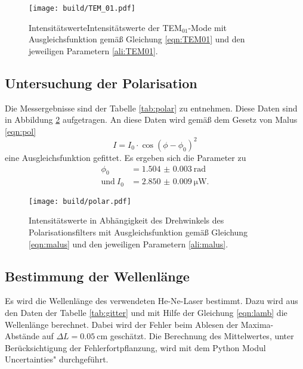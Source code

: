 \begin{figure}
    \centering
    \texttt{[image: build/TEM\_01.pdf]}
    \caption{IntensitätswerteIntensitätswerte der TEM$_{01}$-Mode mit Ausgleichsfunktion gemäß Gleichung \eqref{eqn:TEM01} und den jeweiligen Parametern \eqref{ali:TEM01}.}
    \label{fig:TEM01}
\end{figure}

\subsection{Untersuchung der Polarisation}

Die Messergebnisse sind der Tabelle \ref{tab:polar} zu entnehmen. Diese Daten sind in Abbildung \ref{fig:polar} aufgetragen. An diese Daten wird gemäß dem Gesetz von Malus \eqref{eqn:pol} 
\begin{equation}
    I = I_0 \cdot \cos(\phi - \phi_0)^2
    \label{eqn:malus}
\end{equation}
eine Ausgleichsfunktion gefittet. 
Es ergeben sich die Parameter zu
\begin{align}
    \label{ali:malus}
    \phi_0 & = \num{1.504(3)} \: \text{rad} \\
    \text{und} \: I_0 & = \SI{2.850(9)}{\micro\watt}.
\end{align}



\begin{figure}
    \centering
    \texttt{[image: build/polar.pdf]}
    \caption{Intensitätswerte in Abhängigkeit des Drehwinkels des Polarisationsfilters mit Ausgleichsfunktion gemäß Gleichung \ref{eqn:malus} und den jeweiligen Parametern \eqref{ali:malus}.}
    \label{fig:polar}
\end{figure}

\subsection{Bestimmung der Wellenlänge}

Es wird die Wellenlänge des verwendeten He-Ne-Laser bestimmt. Dazu wird aus den Daten der Tabelle \ref{tab:gitter} und mit Hilfe der Gleichung \eqref{eqn:lamb} die Wellenlänge berechnet. Dabei wird der Fehler beim Ablesen der Maxima-Abstände auf $\Delta L = \SI{0.05}{\centi\m}$ geschätzt. Die Berechnung des Mittelwertes, unter Berücksichtigung der Fehlerfortpflanzung, wird mit dem Python Modul \glqq Uncertainties" \cite{uncertainties} durchgeführt. 


